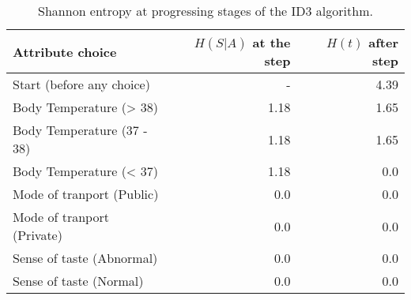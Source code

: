 \documentclass[a4paper, 12pt]{article}
\begin{document}
\begin{table}[ht!]
    \centering
    \caption{Shannon entropy at progressing stages of the ID3 algorithm.} \label{table:entropy}
    \begin{tabular}{|l r r|}
        \hline
        Attribute choice            & $H(S|A)$ at the step & $H(t)$ after step \\
        \hline
        Start (before any choice)   & -                    & 4.39              \\
        Body Temperature (> 38)     & 1.18                 & 1.65              \\
        Body Temperature (37 -  38) & 1.18                 & 1.65              \\
        Body Temperature (< 37)     & 1.18                 & 0.0               \\
        Mode of tranport (Public)   & 0.0                  & 0.0               \\
        Mode of tranport (Private)  & 0.0                  & 0.0               \\
        Sense of taste (Abnormal)   & 0.0                  & 0.0               \\
        Sense of taste (Normal)     & 0.0                  & 0.0               \\
        \hline
    \end{tabular}
\end{table}
\end{document}
